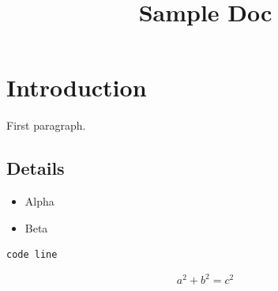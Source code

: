 \documentclass{article}
\title{Sample Doc}
\begin{document}
\maketitle
\section{Introduction}
First paragraph.

\subsection{Details}
\begin{itemize}
\item Alpha
\item Beta
\end{itemize}
\begin{verbatim}
code line
\end{verbatim}
\[
a^2 + b^2 = c^2
\]
\end{document}
